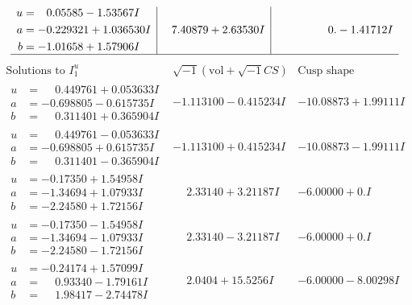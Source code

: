 \documentclass[1p]{elsarticle_modified}
\theoremstyle{definition}
\newcommand{\I}{\sqrt{-1}}
\begin{document}
$$\begin{array}{c|c|c}
\begin{aligned}
u &= \phantom{-}0.05585 - 1.53567 I \\
a &= -0.229321 + 1.036530 I \\
b &= -1.01658 + 1.57906 I\end{aligned}
 & \phantom{-}7.40879 + 2.63530 I & \phantom{-0.000000 } 0. - 1.41712 I\\
 \hline 
 \end{array}$$\newpage$$\begin{array}{c|c|c}  
\text{Solutions to }I^u_{1}& \I (\text{vol} + \sqrt{-1}CS) & \text{Cusp shape}\\
 \hline 
\begin{aligned}
u &= \phantom{-}0.449761 + 0.053633 I \\
a &= -0.698805 - 0.615735 I \\
b &= \phantom{-}0.311401 + 0.365904 I\end{aligned}
 & -1.113100 - 0.415234 I & -10.08873 + 1.99111 I \\ \hline\begin{aligned}
u &= \phantom{-}0.449761 - 0.053633 I \\
a &= -0.698805 + 0.615735 I \\
b &= \phantom{-}0.311401 - 0.365904 I\end{aligned}
 & -1.113100 + 0.415234 I & -10.08873 - 1.99111 I \\ \hline\begin{aligned}
u &= -0.17350 + 1.54958 I \\
a &= -1.34694 + 1.07933 I \\
b &= -2.24580 + 1.72156 I\end{aligned}
 & \phantom{-}2.33140 + 3.21187 I & -6.00000 + 0. I\phantom{ +0.000000I} \\ \hline\begin{aligned}
u &= -0.17350 - 1.54958 I \\
a &= -1.34694 - 1.07933 I \\
b &= -2.24580 - 1.72156 I\end{aligned}
 & \phantom{-}2.33140 - 3.21187 I & -6.00000 + 0. I\phantom{ +0.000000I} \\ \hline\begin{aligned}
u &= -0.24174 + 1.57099 I \\
a &= \phantom{-}0.93340 - 1.79161 I \\
b &= \phantom{-}1.98417 - 2.74478 I\end{aligned}
 & \phantom{-}2.0404 + 15.5256 I & -6.00000 - 8.00298 I \\ \hline\begin{aligned}

\end{aligned}
\end{array}$$
\end{document}
